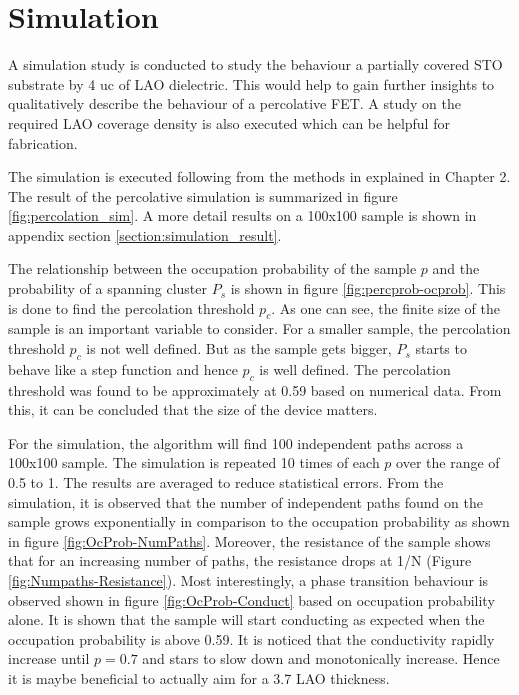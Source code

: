 \documentclass[11pt,a4paper]{report}
\begin{document}
\newpage

\section{Simulation}
A simulation study is conducted to study the behaviour a partially covered STO substrate by 4 uc of LAO dielectric. This would help to gain further insights to qualitatively describe the behaviour of a percolative FET. A study on the required LAO coverage density is also executed which can be helpful for fabrication. 

The simulation is executed following from the methods in explained in Chapter 2. The result of the percolative simulation is summarized in figure \ref{fig:percolation_sim}. A more detail results on a 100x100 sample is shown in appendix section \ref{section:simulation_result}.

The relationship between the occupation probability of the sample $p$ and the probability of a spanning cluster $P_s$ is shown in figure \ref{fig:percprob-ocprob}. This is done to find the percolation threshold $p_c$. As one can see, the finite size of the sample is an important variable to consider. For a smaller sample, the percolation threshold $p_c$ is not well defined. But as the sample gets bigger, $P_s$ starts to behave like a step function and hence $p_c$ is well defined. The percolation threshold was found to be approximately at 0.59 based on numerical data. From this, it can be concluded that the size of the device matters. 

For the simulation, the algorithm will find 100 independent paths across a 100x100 sample. The simulation is repeated 10 times of each $p$ over the range of 0.5 to 1. The results are averaged to reduce statistical errors. From the simulation, it is observed that the number of independent paths found on the sample grows exponentially in comparison to the occupation probability as shown in figure \ref{fig:OcProb-NumPaths}. Moreover, the resistance of the sample shows that for an increasing number of paths, the resistance drops at 1/N (Figure \ref{fig:Numpaths-Resistance}). Most interestingly, a phase transition behaviour is observed shown in figure \ref{fig:OcProb-Conduct} based on occupation probability alone. It is shown that the sample will start conducting as expected when the occupation probability is above 0.59. It is noticed that the conductivity rapidly increase until $p=0.7$ and stars to slow down and monotonically increase. Hence it is maybe beneficial to actually aim for a 3.7 LAO thickness. 
\end{document}
